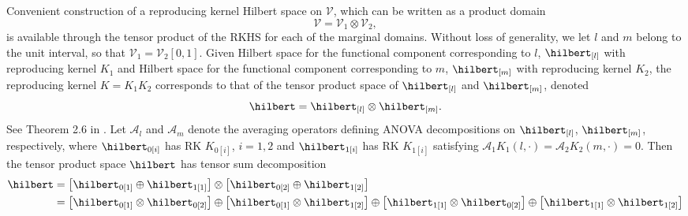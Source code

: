 Convenient construction of a reproducing kernel Hilbert space on $\mathcal{V}$, which can be written as a product domain
\[
\mathcal{V} = \mathcal{V}_1 \otimes \mathcal{V}_2,
\]
\noindent
is available through the tensor product of the RKHS for each of the marginal domains. Without loss of generality, we let $l$ and $m$ belong to the unit interval, so that $\mathcal{V}_1 = \mathcal{V}_2\left[0,1\right]$. Given Hilbert space for the functional component corresponding to $l$, $\hilbert_{\left[l\right]}$ with reproducing kernel $K_1$ and Hilbert space for the functional component corresponding to $m$, $\hilbert_{\left[m\right]}$ with reproducing kernel $K_2$, the reproducing kernel $K = K_{1}K_{2}$ corresponds to that of the tensor product space of $\hilbert_{\left[l\right]}$ and $\hilbert_{\left[m\right]}$, denoted
\[
\hilbert = \hilbert_{\left[l\right]} \otimes \hilbert_{\left[m\right]}.
\]
\noindent
See Theorem 2.6 in \cite{gu2002smoothing}. Let $\mathcal{A}_l$ and $\mathcal{A}_m$ denote the averaging operators defining ANOVA decompositions on $\hilbert_{\left[l\right]}$, $\hilbert_{\left[m\right]}$, respectively, where $\hilbert_{0\left[i\right]}$ has RK $K_{0\left[i\right]}$, $i = 1, 2$ and $\hilbert_{1\left[i\right]}$ has RK $K_{1\left[i\right]}$ satisfying $\mathcal{A}_1K_{1}\left(l,\cdot\right) = \mathcal{A}_2K_{2}\left(m,\cdot\right) = 0$. Then the tensor product space $\hilbert$ has tensor sum decomposition
\begin{align} 
\begin{split} \label{eq:tensor-sum-decomposition}
\hilbert &= \left[\hilbert_{0\left[1\right]} \oplus \hilbert_{1\left[1\right]} \right] \otimes \left[\hilbert_{0\left[2\right]} \oplus \hilbert_{1\left[2\right]} \right] \\
&= \left[\hilbert_{0\left[1\right]} \otimes  \hilbert_{0\left[2\right]}\right] \oplus \left[\hilbert_{0\left[1\right]} \otimes \hilbert_{1\left[2\right]}\right] \oplus \left[\hilbert_{1\left[1\right]} \otimes  \hilbert_{0\left[2\right]}\right] \oplus \left[\hilbert_{1\left[1\right]} \otimes  \hilbert_{1\left[2\right]}\right] 
\end{split}
\end{align}

